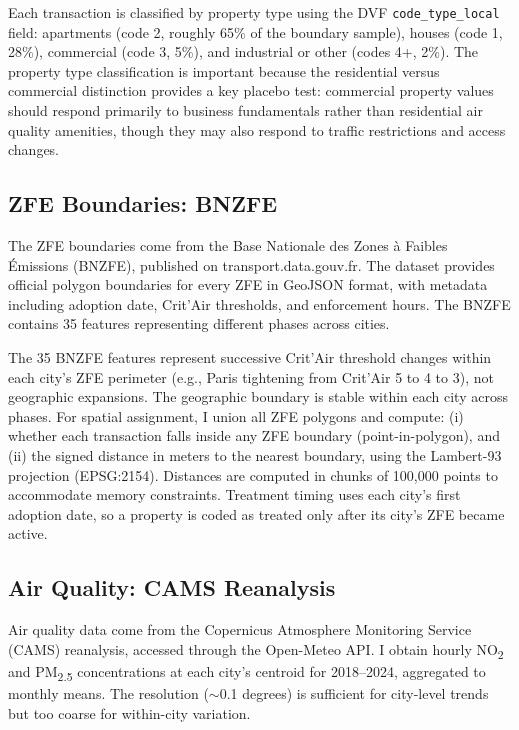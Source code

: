 \documentclass[12pt]{article}
\begin{document}
Each transaction is classified by property type using the DVF \texttt{code\_type\_local} field: apartments (code 2, roughly 65\% of the boundary sample), houses (code 1, 28\%), commercial (code 3, 5\%), and industrial or other (codes 4+, 2\%). The property type classification is important because the residential versus commercial distinction provides a key placebo test: commercial property values should respond primarily to business fundamentals rather than residential air quality amenities, though they may also respond to traffic restrictions and access changes.

\subsection{ZFE Boundaries: BNZFE}

The ZFE boundaries come from the Base Nationale des Zones \`a Faibles \'Emissions (BNZFE), published on transport.data.gouv.fr. The dataset provides official polygon boundaries for every ZFE in GeoJSON format, with metadata including adoption date, Crit'Air thresholds, and enforcement hours. The BNZFE contains 35 features representing different phases across cities.

The 35 BNZFE features represent successive Crit'Air threshold changes within each city's ZFE perimeter (e.g., Paris tightening from Crit'Air 5 to 4 to 3), not geographic expansions. The geographic boundary is stable within each city across phases. For spatial assignment, I union all ZFE polygons and compute: (i) whether each transaction falls inside any ZFE boundary (point-in-polygon), and (ii) the signed distance in meters to the nearest boundary, using the Lambert-93 projection (EPSG:2154). Distances are computed in chunks of 100,000 points to accommodate memory constraints. Treatment timing uses each city's first adoption date, so a property is coded as treated only after its city's ZFE became active.

\subsection{Air Quality: CAMS Reanalysis}

Air quality data come from the Copernicus Atmosphere Monitoring Service (CAMS) reanalysis, accessed through the Open-Meteo API. I obtain hourly NO\textsubscript{2} and PM\textsubscript{2.5} concentrations at each city's centroid for 2018--2024, aggregated to monthly means. The resolution ($\sim$0.1 degrees) is sufficient for city-level trends but too coarse for within-city variation.
\end{document}
